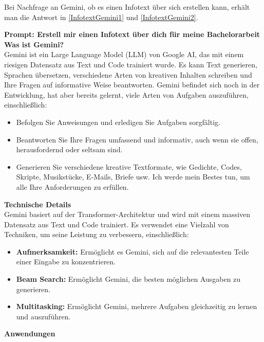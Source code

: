 Bei Nachfrage an Gemini, ob es einen Infotext über sich erstellen kann, erhält man die Antwort in \autoref{InfotextGemini1} und \autoref{InfotextGemini2}.

\begin{prompt}
    \begin{tcolorbox}[colback=gray!20, colframe=gray!20, boxrule=0pt, sharp corners] 
    \textbf{Prompt: Erstell mir einen Infotext über dich für meine Bachelorarbeit}\\ 
        \textbf{Was ist Gemini?}\\
        Gemini ist ein Large Language Model (LLM) von Google AI, das mit einem riesigen Datensatz aus Text und Code 
        trainiert wurde. Es kann Text generieren, Sprachen übersetzen, verschiedene Arten von kreativen Inhalten schreiben 
        und Ihre Fragen auf informative Weise beantworten. Gemini befindet sich noch in der Entwicklung, hat aber bereits gelernt,
        viele Arten von Aufgaben auszuführen, einschließlich:
        \begin{itemize}
            \item Befolgen Sie Anweisungen und erledigen Sie Aufgaben sorgfältig.
            \item Beantworten Sie Ihre Fragen umfassend und informativ, auch wenn sie offen, herausfordernd oder seltsam sind.
            \item Generieren Sie verschiedene kreative Textformate, wie Gedichte, Codes, Skripte, Musikstücke, E-Mails, Briefe usw. 
                  Ich werde mein Bestes tun, um alle Ihre Anforderungen zu erfüllen.
        \end{itemize}
        \textbf{Technische Details}\\
        Gemini basiert auf der Transformer-Architektur und wird mit einem massiven Datensatz aus Text und Code trainiert. 
        Es verwendet eine Vielzahl von Techniken, um seine Leistung zu verbessern, einschließlich:
        \begin{itemize}
            \item \textbf{Aufmerksamkeit:} Ermöglicht es Gemini, sich auf die relevantesten Teile einer Eingabe zu konzentrieren.
            \item \textbf{Beam Search:} Ermöglicht Gemini, die besten möglichen Ausgaben zu generieren.
            \item \textbf{Multitasking:} Ermöglicht Gemini, mehrere Aufgaben gleichzeitig zu lernen und auszuführen.
        \end{itemize}
        \textbf{Anwendungen}\\

\end{tcolorbox}
\end{prompt}
